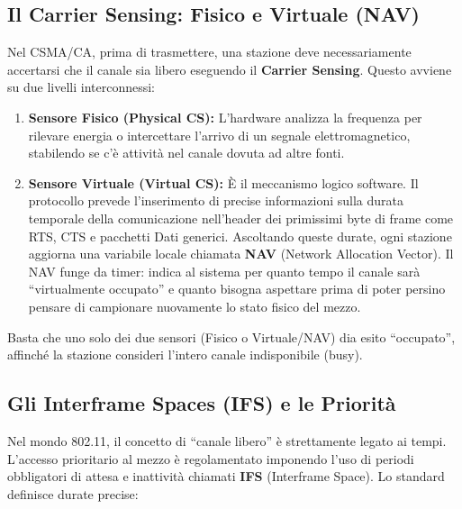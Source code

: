 \documentclass[
  italian,
  openany]{book}
\begin{document}
\subsection{Il Carrier Sensing: Fisico e Virtuale
(NAV)}\label{il-carrier-sensing-fisico-e-virtuale-nav}

Nel CSMA/CA, prima di trasmettere, una stazione deve necessariamente
accertarsi che il canale sia libero eseguendo il \textbf{Carrier
Sensing}. Questo avviene su due livelli interconnessi:

\begin{enumerate}
\def\labelenumi{\arabic{enumi}.}
\item
  \textbf{Sensore Fisico (Physical CS):} L'hardware analizza la
  frequenza per rilevare energia o intercettare l'arrivo di un segnale
  elettromagnetico, stabilendo se c'è attività nel canale dovuta ad
  altre fonti.
\item
  \textbf{Sensore Virtuale (Virtual CS):} È il meccanismo logico
  software. Il protocollo prevede l'inserimento di precise informazioni
  sulla durata temporale della comunicazione nell'header dei primissimi
  byte di frame come RTS, CTS e pacchetti Dati generici. Ascoltando
  queste durate, ogni stazione aggiorna una variabile locale chiamata
  \textbf{NAV} (Network Allocation Vector). Il NAV funge da timer:
  indica al sistema per quanto tempo il canale sarà ``virtualmente
  occupato'' e quanto bisogna aspettare prima di poter persino pensare
  di campionare nuovamente lo stato fisico del mezzo.
\end{enumerate}

Basta che uno solo dei due sensori (Fisico o Virtuale/NAV) dia esito
``occupato'', affinché la stazione consideri l'intero canale
indisponibile (busy).

\subsection{Gli Interframe Spaces (IFS) e le
Priorità}\label{gli-interframe-spaces-ifs-e-le-priorituxe0}

Nel mondo 802.11, il concetto di ``canale libero'' è strettamente legato
ai tempi. L'accesso prioritario al mezzo è regolamentato imponendo l'uso
di periodi obbligatori di attesa e inattività chiamati \textbf{IFS}
(Interframe Space). Lo standard definisce durate precise:
\end{document}

